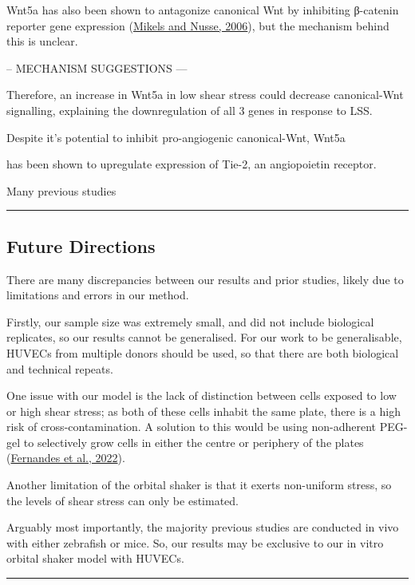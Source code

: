 \documentclass[
  11pt,
]{article}
\begin{document}
Wnt5a has also been shown to antagonize canonical Wnt by inhibiting β-catenin reporter gene expression (\protect\hyperlink{ref-Mikels2006}{Mikels and Nusse, 2006}), but the mechanism behind this is unclear.

-- MECHANISM SUGGESTIONS ---

Therefore, an increase in Wnt5a in low shear stress could decrease canonical-Wnt signalling, explaining the downregulation of all 3 genes in response to LSS.

Despite it's potential to inhibit pro-angiogenic canonical-Wnt, Wnt5a

has been shown to upregulate expression of Tie-2, an angiopoietin receptor.

Many previous studies

\begin{center}\rule{0.5\linewidth}{0.5pt}\end{center}

\hypertarget{future-directions}{%
\subsection{Future Directions}\label{future-directions}}

There are many discrepancies between our results and prior studies, likely due to limitations and errors in our method.

Firstly, our sample size was extremely small, and did not include biological replicates, so our results cannot be generalised.
For our work to be generalisable, HUVECs from multiple donors should be used, so that there are both biological and technical repeats.

One issue with our model is the lack of distinction between cells exposed to low or high shear stress; as both of these cells inhabit the same plate, there is a high risk of cross-contamination.
A solution to this would be using non-adherent PEG-gel to selectively grow cells in either the centre or periphery of the plates (\protect\hyperlink{ref-Fernandes2022}{Fernandes et al., 2022}).

Another limitation of the orbital shaker is that it exerts non-uniform stress, so the levels of shear stress can only be estimated.

Arguably most importantly, the majority previous studies are conducted in vivo with either zebrafish or mice.
So, our results may be exclusive to our in vitro orbital shaker model with HUVECs.

\begin{center}\rule{0.5\linewidth}{0.5pt}\end{center}
\end{document}

